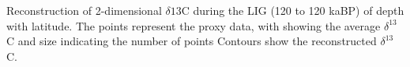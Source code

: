 Reconstruction of 2-dimensional $\delta{13}$C during the LIG (120 to 120 kaBP) of depth with latitude. The points represent the proxy data, with showing the average $\delta^{13}$C and size indicating the number of points Contours show the reconstructed $\delta^{13}$C.